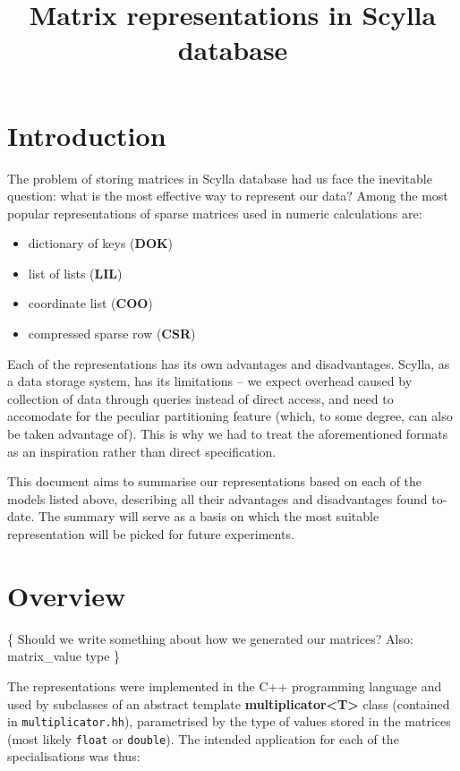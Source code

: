 \documentclass{article}
\newcommand{\code}[0]{\texttt}
\begin{document}
\thispagestyle{empty}\phantom{m} \vspace{4em}

\title{Matrix representations in Scylla database}
\date{}
\author{}
\maketitle

\section*{Introduction}
The problem of storing matrices in Scylla database had us face the inevitable question: what is the most effective way to represent our data? 
Among the most popular representations of sparse matrices used in numeric calculations are:
\begin{itemize}
\item dictionary of keys (\textbf{DOK})
\item list of lists (\textbf{LIL})
\item coordinate list (\textbf{COO})
\item compressed sparse row (\textbf{CSR})
\end{itemize}

Each of the representations has its own advantages and disadvantages. Scylla, as a data storage system, has its limitations -- we expect overhead caused by collection of data through queries instead of direct access, and need to accomodate for the peculiar partitioning feature (which, to some degree, can also be taken advantage of). This is why we had to treat the aforementioned formats as an inspiration rather than direct specification. 

This document aims to summarise our representations based on each of the models listed above, describing all their advantages and disadvantages found to-date. The summary will serve as a basis on which the most suitable representation will be picked for future experiments.

\pagebreak
\section*{Overview}

\{ Should we write something about how we generated our matrices? Also: matrix\_value type \}

The representations were implemented in the C++ programming language and used by subclasses of an abstract template \textbf{multiplicator\textless T\textgreater} class (contained in \code{multiplicator.hh}), parametrised by the type of values stored in the matrices (most likely \code{float} or \code{double}). The intended application for each of the specialisations was thus:
\end{document}
